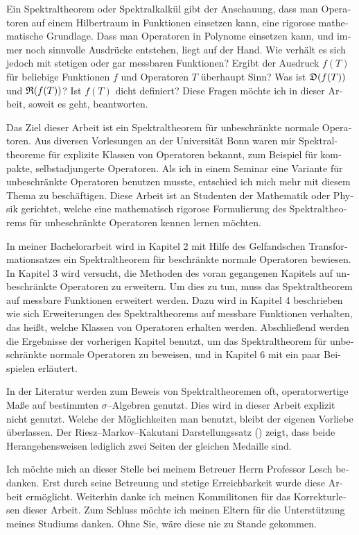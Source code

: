 \vspace{.35cm}

\noindent
\begin{otherlanguage}{ngerman}
Ein Spektraltheorem oder Spektralkalkül gibt der Anschauung, dass man 
Operatoren auf einem Hilbertraum in Funktionen einsetzen kann, eine 
rigorose mathematische Grundlage.
Dass man Operatoren in Polynome einsetzen kann, und immer noch sinnvolle
Ausdrücke entstehen, liegt auf der Hand. Wie verhält es sich jedoch mit
stetigen oder gar messbaren Funktionen? Ergibt der Ausdruck $f(T)$ für
beliebige Funktionen $f$ und Operatoren $T$ überhaupt Sinn? Was ist 
$\mathfrak{D}(f(T))$ und $\mathfrak{R}(f(T))$? Ist $f(T)$ dicht definiert?
Diese Fragen möchte ich in dieser Arbeit, soweit es geht, beantworten.

Das Ziel dieser Arbeit ist ein Spektraltheorem für unbeschränkte normale 
Operatoren. Aus diversen Vorlesungen an der Universität Bonn waren mir
Spektraltheoreme für explizite Klassen von Operatoren bekannt, zum 
Beispiel für kompakte, selbstadjungerte Operatoren. Als ich in einem Seminar
eine Variante für unbeschränkte Operatoren benutzen musste, entschied ich
mich mehr mit diesem Thema zu beschäftigen. Diese Arbeit
ist an Studenten der Mathematik oder Physik gerichtet, welche eine 
mathematisch rigorose Formulierung des Spektraltheorems
für unbeschränkte Operatoren kennen lernen möchten.

In meiner Bachelorarbeit wird in Kapitel 2 mit Hilfe des Gelfandschen 
Transformationsatzes ein Spektraltheorem für beschränkte normale Operatoren 
bewiesen. In Kapitel 3 wird versucht, die Methoden des voran gegangenen Kapitels
auf unbeschränkte Operatoren zu erweitern. Um dies zu tun, muss das 
Spektraltheorem auf messbare Funktionen erweitert werden.
Dazu wird in Kapitel 4 beschrieben wie sich Erweiterungen des 
Spektraltheorems auf messbare Funktionen verhalten, das heißt, welche Klassen
von Operatoren erhalten werden. Abschließend werden die Ergebnisse der 
vorherigen Kapitel benutzt, um das Spektraltheorem für unbeschränkte normale
Operatoren zu beweisen, und in Kapitel 6 mit ein paar Beispielen erläutert.

In der Literatur werden zum Beweis von Spektraltheoremen oft, operatorwertige
Maße auf bestimmten $\sigma$--Algebren genutzt.
Dies wird in dieser Arbeit explizit nicht genutzt. Welche der Möglichkeiten
man benutzt, bleibt der eigenen Vorliebe überlassen. Der Riesz--Markov--Kakutani
Darstellungssatz (\cite[Theorem 6.3.4]{PedAnaN})
zeigt, dass beide Herangehensweisen
lediglich zwei Seiten der gleichen Medaille sind. 

Ich möchte mich an dieser Stelle bei meinem Betreuer Herrn Professor Lesch bedanken.
Erst durch seine Betreuung und stetige Erreichbarkeit wurde diese Arbeit ermöglicht.
Weiterhin danke ich meinen Kommilitonen für das Korrekturlesen dieser Arbeit. 
Zum Schluss möchte ich meinen Eltern für die Unterstützung meines Studiums danken.
Ohne Sie, wäre diese nie zu Stande gekommen.


\end{otherlanguage}
